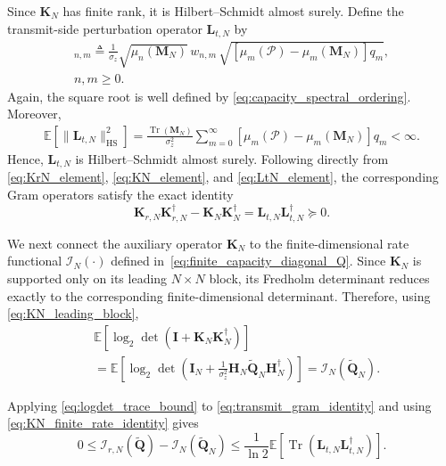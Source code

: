 \documentclass[lettersize,journal]{IEEEtran}
\theoremstyle{plain}
\begin{document}
Since $\mathbf K_N$ has finite rank, it is Hilbert--Schmidt
almost surely. Define the transmit-side perturbation operator
$\mathbf L_{t,N}$ by
\begin{gather}
	[\mathbf L_{t,N}]_{n,m}
	\triangleq
	\frac{1}{\sigma_z}
	\sqrt{\mu_n(\mathbf M_N)}
	\,w_{n,m}\,
	\sqrt{
		\left[
		\mu_m(\mathcal P)-\mu_m(\mathbf M_N)
		\right]q_m
	}, \nonumber \\
	n,m\geq0.
	\label{eq:LtN_element}
\end{gather}
Again, the square root is well defined by
\eqref{eq:capacity_spectral_ordering}. Moreover,
\begin{align}
	\mathbb E
	\left[
	\|\mathbf L_{t,N}\|_{\mathrm{HS}}^2
	\right]
	=
	\frac{\operatorname{Tr}(\mathbf M_N)}
	{\sigma_z^2}
	\sum_{m=0}^{\infty}
	\left[
	\mu_m(\mathcal P)-\mu_m(\mathbf M_N)
	\right]q_m
	<\infty .
	\label{eq:LtN_HS}
\end{align}
Hence, $\mathbf L_{t,N}$ is Hilbert--Schmidt almost surely. Following directly from
\eqref{eq:KrN_element},
\eqref{eq:KN_element}, and
\eqref{eq:LtN_element}, the corresponding Gram operators
satisfy the exact identity
\begin{equation}
	\mathbf K_{r,N}\mathbf K_{r,N}^{\dagger}
	-
	\mathbf K_N\mathbf K_N^{\dagger}
	=
	\mathbf L_{t,N}\mathbf L_{t,N}^{\dagger}
	\succeq0 .
	\label{eq:transmit_gram_identity}
\end{equation}

We next connect the auxiliary operator $\mathbf K_N$ to the
finite-dimensional rate functional
$\mathcal I_N(\cdot)$ defined in~\eqref{eq:finite_capacity_diagonal_Q}. Since
$\mathbf K_N$ is supported only on its leading $N\times N$
block, its Fredholm determinant reduces exactly to the
corresponding finite-dimensional determinant. Therefore,
using \eqref{eq:KN_leading_block},
\begin{align}
	&\mathbb E
	\left[
	\log_2
	\det
	\left(
	\mathbf I+
	\mathbf K_N\mathbf K_N^\dagger
	\right)
	\right]
	\nonumber\\
	&=
	\mathbb E
	\left[
	\log_2
	\det
	\left(
	\mathbf I_N+
	\frac{1}{\sigma_z^2}
	\mathbf H_N
	\widetilde{\mathbf Q}_N
	\mathbf H_N^\dagger
	\right)
	\right] =
	\mathcal I_N
	\left(
	\widetilde{\mathbf Q}_N
	\right).
	\label{eq:KN_finite_rate_identity}
\end{align}

Applying \eqref{eq:logdet_trace_bound} to
\eqref{eq:transmit_gram_identity} and using
\eqref{eq:KN_finite_rate_identity} gives
$$
	0
	\leq
	\mathcal I_{r,N}
	\left(
	\widetilde{\mathbf Q}
	\right)
	-
	\mathcal I_N
	\left(
	\widetilde{\mathbf Q}_N
	\right)
	\leq
	\frac{1}{\ln2}
	\mathbb E
	\left[
	\operatorname{Tr}
	\left(
	\mathbf L_{t,N}\mathbf L_{t,N}^{\dagger}
	\right)
	\right].
	\label{eq:transmit_rate_gap_1}
$$
\end{document}
